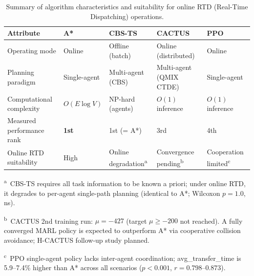 \begin{table}[htbp]
  \centering
  \caption{Summary of algorithm characteristics and suitability for
           online RTD (Real-Time Dispatching) operations.}
  \label{tab:7}
  \small
  \begin{threeparttable}
    \begin{tabular}{lllll}
      \toprule
      \textbf{Attribute}
        & \textbf{A*}
        & \textbf{CBS-TS}
        & \textbf{CACTUS}
        & \textbf{PPO} \\
      \midrule
      Operating mode
        & Online
        & Offline (batch)
        & Online (distributed)
        & Online \\
      Planning paradigm
        & Single-agent
        & Multi-agent (CBS)
        & Multi-agent (QMIX CTDE)
        & Single-agent \\
      Computational complexity
        & $O(E \log V)$
        & NP-hard (agents)
        & $O(1)$ inference
        & $O(1)$ inference \\
      Measured performance rank
        & \textbf{1st}
        & 1st (= A*)
        & 3rd
        & 4th \\
      Online RTD suitability
        & High
        & Online degradation\textsuperscript{a}
        & Convergence pending\textsuperscript{b}
        & Cooperation limited\textsuperscript{c} \\
      \bottomrule
    \end{tabular}
    \begin{tablenotes}
      \footnotesize
      \item \textsuperscript{a}~CBS-TS requires all task information to be known a priori;
            under online RTD, it degrades to per-agent single-path planning
            (identical to A*; Wilcoxon $p{=}1.0$, ns).
      \item \textsuperscript{b}~CACTUS 2nd training run: $\mu{=}{-}427$
            (target $\mu{\geq}{-}200$ not reached).
            A fully converged MARL policy is expected to outperform A* via
            cooperative collision avoidance; H-CACTUS follow-up study planned.
      \item \textsuperscript{c}~PPO single-agent policy lacks inter-agent coordination;
            avg\_transfer\_time is 5.9--7.4\% higher than A* across all scenarios
            ($p{<}0.001$, $r{=}0.798$--$0.873$).
    \end{tablenotes}
  \end{threeparttable}
\end{table}


